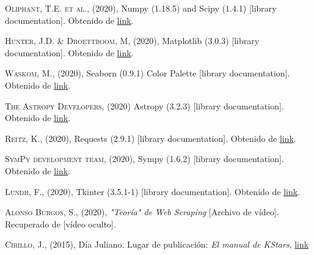 \documentclass[11pt]{book}
\begin{document}
\begin{thebibliography}{99}

 \textsc{Oliphant, T.E. et al.}, (2020), Numpy (1.18.5) and Scipy (1.4.1) [library documentation]. Obtenido de \href{https://docs.scipy.org/doc/}{link}.

 \textsc{Hunter, J.D. \& Droettboom, M}, (2020), Matplotlib (3.0.3) [library documentation]. Obtenido de \href{https://matplotlib.org/3.0.3/index.html}{link}.

 \textsc{Waskom, M.}, (2020), Seaborn (0.9.1) Color Palette [library documentation]. Obtenido de \href{https://seaborn.pydata.org/tutorial/color_palettes.html}{link}.

 \textsc{The Astropy Developers}, (2020) Astropy (3.2.3) [library documentation]. Obtenido de \href{https://docs.astropy.org/en/stable/index.html}{link}.

 \textsc{Reitz, K.}, (2020), Requests (2.9.1) [library documentation]. Obtenido de \href{https://requests.readthedocs.io/_/downloads/es/es/latest/pdf/}{link}.

 \textsc{SymPy development team}, (2020), Sympy (1.6.2) [library documentation]. Obtenido de \href{https://docs.sympy.org/latest/index.html}{link}.

 \textsc{Lundh, F.}, (2020), Tkinter (3.5.1-1) [library documentation]. Obtenido de \href{https://docs.python.org/3/library/tk.html}{link}.

 \textsc{Alonso Burgos, S.}, (2020), \textit{"Teoría" de Web Scraping} [Archivo de vídeo]. Recuperado de [vídeo oculto].

 \textsc{Cirillo, J.}, (2015), Día Juliano. Lugar de publicación: \textit{El manual de KStars}, \href{https://docs.kde.org/trunk5/es/extragear-edu/kstars/ai-julianday.html#:~:text=El%20n%C3%BAmero%20de%20d%C3%ADas%20se,n%C3%BAmeros%20de%20sus%20d%C3%ADas%20julianos.}{link}



\end{thebibliography}
\end{document}
